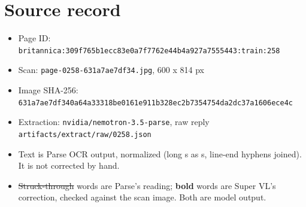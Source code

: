 \documentclass[10pt]{article}
\begin{document}
\section*{Source record}
\begin{itemize}
\item Page ID: \texttt{britannica:309f765b1ecc83e0a7f7762e44b4a927a7555443:train:258}
\item Scan: \texttt{page-0258-631a7ae7df34.jpg}, 600 x 814 px
\item Image SHA-256: \texttt{\small 631a7ae7df340a64a33318be0161e911b328ec2b7354754da2dc37a1606ece4c}
\item Extraction: \texttt{nvidia/nemotron-3.5-parse}, raw reply \texttt{artifacts/extract/raw/0258.json}
\item Text is Parse OCR output, normalized (long s as s, line-end hyphens joined). It is not corrected by hand.
\item \sout{Struck-through} words are Parse's reading; \textbf{bold} words are Super VL's correction, checked against the scan image. Both are model output.
\end{itemize}
\end{document}
